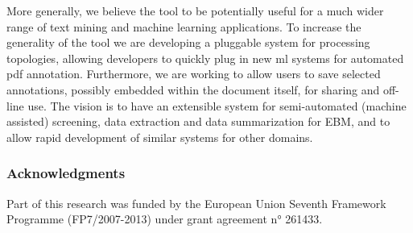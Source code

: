 \documentclass[runningheads,a4paper]{llncs}
\begin{document}
More generally, we believe the tool to be potentially useful for a much wider range of text mining and machine learning applications.
To increase the generality of the tool we are developing a pluggable system for processing topologies, allowing developers to quickly plug in new \ac{ml} systems for automated \ac{pdf} annotation.
Furthermore, we are working to allow users to save selected annotations, possibly embedded within the document itself, for sharing and off-line use.
The vision is to have an extensible system for semi-automated (machine assisted) screening, data extraction and data summarization for EBM, and to allow rapid development of similar systems for other domains.

\subsubsection{Acknowledgments}
Part of this research was funded by the European Union Seventh Framework Programme (FP7/2007-2013) under grant agreement n° 261433. %



\end{document}
